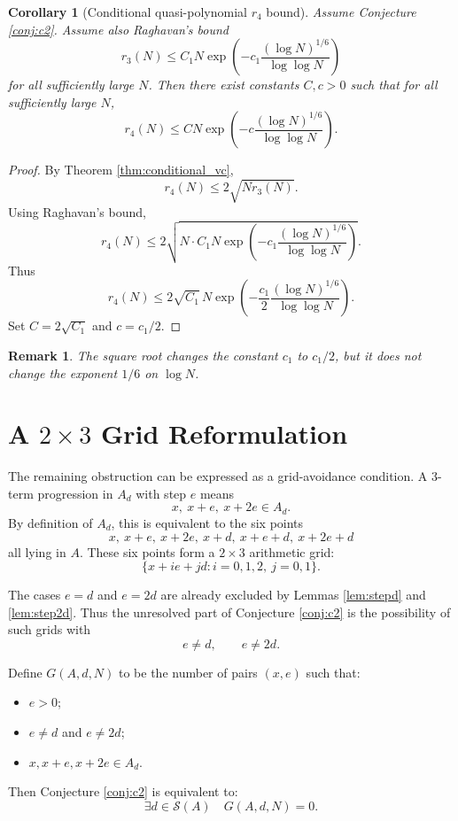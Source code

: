 \documentclass[11pt]{article}
\newtheorem{corollary}[theorem]{Corollary}
\newtheorem{remark}[theorem]{Remark}
\newcommand{\calS}{\mathcal{S}}
\begin{document}
\begin{corollary}[Conditional quasi-polynomial \(r_4\) bound]
\label{cor:conditional_r4}
Assume Conjecture \ref{conj:c2}.  Assume also Raghavan's bound
\[
  r_3(N)
  \leq
  C_1 N
  \exp\!\left(
    -c_1\frac{(\log N)^{1/6}}{\log\log N}
  \right)
\]
for all sufficiently large \(N\).  Then there exist constants \(C,c>0\) such
that for all sufficiently large \(N\),
\[
  r_4(N)
  \leq
  C N
  \exp\!\left(
    -c\frac{(\log N)^{1/6}}{\log\log N}
  \right).
\]
\end{corollary}

\begin{proof}
By Theorem \ref{thm:conditional_vc},
\[
  r_4(N)\leq 2\sqrt{N r_3(N)}.
\]
Using Raghavan's bound,
\[
  r_4(N)
  \leq
  2\sqrt{
    N\cdot
    C_1 N
    \exp\!\left(
      -c_1\frac{(\log N)^{1/6}}{\log\log N}
    \right)
  }.
\]
Thus
\[
  r_4(N)
  \leq
  2\sqrt{C_1}\,N
  \exp\!\left(
    -\frac{c_1}{2}\frac{(\log N)^{1/6}}{\log\log N}
  \right).
\]
Set \(C=2\sqrt{C_1}\) and \(c=c_1/2\).
\end{proof}

\begin{remark}
The square root changes the constant \(c_1\) to \(c_1/2\), but it does not change
the exponent \(1/6\) on \(\log N\).
\end{remark}

\section{A \(2\times3\) Grid Reformulation}

The remaining obstruction can be expressed as a grid-avoidance condition.  A
3-term progression in \(A_d\) with step \(e\) means
\[
  x,\ x+e,\ x+2e\in A_d.
\]
By definition of \(A_d\), this is equivalent to the six points
\[
  x,\ x+e,\ x+2e,\ x+d,\ x+e+d,\ x+2e+d
\]
all lying in \(A\).  These six points form a \(2\times 3\) arithmetic grid:
\[
  \{x+ie+jd: i=0,1,2,\ j=0,1\}.
\]

The cases \(e=d\) and \(e=2d\) are already excluded by Lemmas
\ref{lem:stepd} and \ref{lem:step2d}.  Thus the unresolved part of
Conjecture \ref{conj:c2} is the possibility of such grids with
\[
  e\neq d,\qquad e\neq 2d.
\]

Define \(G(A,d,N)\) to be the number of pairs \((x,e)\) such that:
\begin{itemize}
  \item \(e>0\);
  \item \(e\neq d\) and \(e\neq 2d\);
  \item \(x,x+e,x+2e\in A_d\).
\end{itemize}
Then Conjecture \ref{conj:c2} is equivalent to:
\[
  \exists d\in\calS(A)\quad G(A,d,N)=0.
\]
\end{document}
